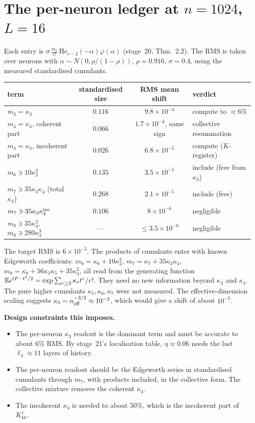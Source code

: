 \section{The per-neuron ledger at $n=1024$, $L=16$}
Each entry is $\sigma\,\frac{m_r}{r!}\,\mathrm{He}_{r-2}(-\alpha)\varphi(\alpha)$ (stage~20, Thm.~2.2). The RMS is taken over neurons with
$\alpha\sim N(0,\rho/(1-\rho))$, $\rho=0.916$, $\sigma=0.4$, using the measured standardised cumulants.
\begin{center}\small
\begin{tabular}{@{}lccl@{}}\toprule
term & standardised size & RMS mean shift & verdict\\\midrule
$m_3=\kappa_3$ & $0.116$ & $9.8\times10^{-4}$ & compute to $\approx6\%$\\
$m_4=\kappa_4$, coherent part & $0.066$ & $1.7\times10^{-4}$, same sign & collective resummation\\
$m_4=\kappa_4$, incoherent part & $0.026$ & $6.8\times10^{-5}$ & compute ($K$-register)\\
$m_6\ni10\kappa_3^2$ & $0.135$ & $3.5\times10^{-5}$ & include (free from $\kappa_3$)\\
$m_7\ni35\kappa_3\kappa_4$ (total $\kappa_4$) & $0.268$ & $2.1\times10^{-5}$ & include (free)\\
$m_7\ni35\kappa_3\kappa_4^{\rm inc}$ & $0.106$ & $8\times10^{-6}$ & negligible\\
$m_8\ni35\kappa_4^2$, $m_9\ni280\kappa_3^3$ & --- & $\le3.5\times10^{-6}$ & negligible\\\bottomrule
\end{tabular}
\end{center}
The target RMS is $6\times10^{-5}$. The products of cumulants enter with known Edgeworth coefficients:
$m_6=\kappa_6+10\kappa_3^2$, $m_7=\kappa_7+35\kappa_3\kappa_4$, $m_8=\kappa_8+56\kappa_3\kappa_5+35\kappa_4^2$, all read from the generating function
$\mathbb{E} e^{tF-t^2/2}=\exp\sum_{r\ge3}\kappa_rt^r/r!$. They need no new information beyond $\kappa_3$ and $\kappa_4$. The pure higher
cumulants $\kappa_5,\kappa_6,\kappa_7$ were not measured. The effective-dimension scaling suggests
$\kappa_5\sim n_{\rm eff}^{-3/2}\approx10^{-3}$, which would give a shift of about $10^{-5}$.

\noindent\textbf{Design constraints this imposes.}
\begin{itemize}[leftmargin=1.2em,itemsep=1pt,topsep=1pt]
\item The per-neuron $\kappa_3$ readout is the dominant term and must be accurate to about $6\%$ RMS. By
stage~21's localisation table, $\eta\approx0.06$ needs the last $\ell_3\approx11$ layers of history.
\item The per-neuron readout should be the Edgeworth series in standardised cumulants through $m_7$,
with products included, in the collective form. The collective mixture removes the coherent $\kappa_4$.
\item The incoherent $\kappa_4$ is needed to about $50\%$, which is the incoherent part of $K^z_{kk}$.
\end{itemize}

